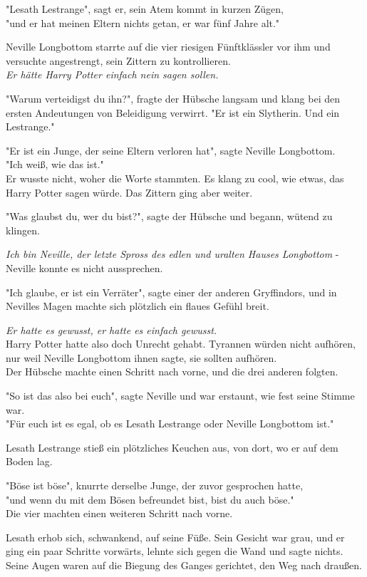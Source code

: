 {"Lesath Lestrange", sagt er, sein Atem kommt in kurzen Zügen,\\ "und er hat meinen Eltern nichts getan, er war fünf Jahre alt."

Neville Longbottom starrte auf die vier riesigen Fünftklässler vor ihm und versuchte angestrengt, sein Zittern zu kontrollieren.\\ \emph{Er hätte Harry Potter einfach nein sagen sollen.}

"Warum verteidigst du ihn?", fragte der Hübsche langsam und klang bei den ersten Andeutungen von Beleidigung verwirrt. "Er ist ein Slytherin. Und ein Lestrange."

"Er ist ein Junge, der seine Eltern verloren hat", sagte Neville Longbottom.\\ "Ich weiß, wie das ist."\\ Er wusste nicht, woher die Worte stammten. Es klang zu cool, wie etwas, das Harry Potter sagen würde. Das Zittern ging aber weiter.

"Was glaubst du, wer du bist?", sagte der Hübsche und begann, wütend zu klingen.

\emph{Ich bin Neville, der letzte Spross des edlen und uralten Hauses Longbottom} - Neville konnte es nicht aussprechen.

"Ich glaube, er ist ein Verräter", sagte einer der anderen Gryffindors, und in Nevilles Magen machte sich plötzlich ein flaues Gefühl breit.

\emph{Er hatte es gewusst, er hatte es einfach gewusst.}\\ Harry Potter hatte also doch Unrecht gehabt. Tyrannen würden nicht aufhören, nur weil Neville Longbottom ihnen sagte, sie sollten aufhören.\\ Der Hübsche machte einen Schritt nach vorne, und die drei anderen folgten.

"So ist das also bei euch", sagte Neville und war erstaunt, wie fest seine Stimme war.\\ "Für euch ist es egal, ob es Lesath Lestrange oder Neville Longbottom ist."

Lesath Lestrange stieß ein plötzliches Keuchen aus, von dort, wo er auf dem Boden lag.

"Böse ist böse", knurrte derselbe Junge, der zuvor gesprochen hatte,\\ "und wenn du mit dem Bösen befreundet bist, bist du auch böse."\\ Die vier machten einen weiteren Schritt nach vorne.

Lesath erhob sich, schwankend, auf seine Füße. Sein Gesicht war grau, und er ging ein paar Schritte vorwärts, lehnte sich gegen die Wand und sagte nichts.\\ Seine Augen waren auf die Biegung des Ganges gerichtet, den Weg nach draußen.

}
